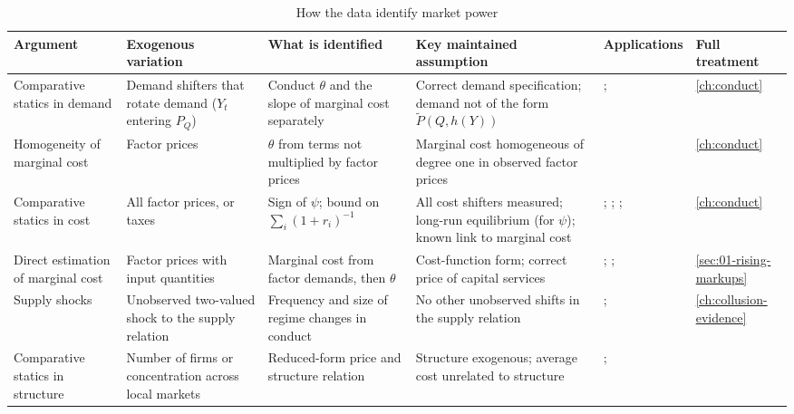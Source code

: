 \begin{table}[htbp]
\centering
\begin{threeparttable}
\caption{How the data identify market power}
\label{tab:01-id-strategies}
\footnotesize
\setlength{\tabcolsep}{4pt}
\begin{tabularx}{\textwidth}{@{}>{\raggedright\arraybackslash}p{2.05cm}
  >{\raggedright\arraybackslash}X >{\raggedright\arraybackslash}X >{\raggedright\arraybackslash}X
  >{\raggedright\arraybackslash}p{2.2cm} >{\raggedright\arraybackslash}p{1.8cm}@{}}
\toprule
Argument & Exogenous variation & What is identified & Key maintained assumption & Applications & Full treatment \\
\midrule
Comparative statics in demand & Demand shifters that rotate demand ($Y_t$ entering $P_Q$) & Conduct $\theta$ and
  the slope of marginal cost separately & Correct demand specification; demand not of the form $\tilde P(Q, h(Y))$ &
  \citet{JustChern1980}; \citet{Bresnahan1981,Bresnahan1987} & \cref{ch:conduct} \\
\addlinespace
Homogeneity of marginal cost & Factor prices & $\theta$ from terms not multiplied by factor prices & Marginal cost
  homogeneous of degree one in observed factor prices & \citet{Appelbaum1979,Appelbaum1982} & \cref{ch:conduct} \\
\addlinespace
Comparative statics in cost & All factor prices, or taxes & Sign of $\psi$; bound on $\sum_i (1 + r_i)^{-1}$ &
  All cost shifters measured; long-run equilibrium (for $\psi$); known link to marginal cost &
  \citet{PanzarRosse1977}; \citet{Shaffer1982}; \citet{Sullivan1985}; \citet{AshenfelterSullivan1987} &
  \cref{ch:conduct} \\
\addlinespace
Direct estimation of marginal cost & Factor prices with input quantities & Marginal cost from factor demands, then
  $\theta$ & Cost-function form; correct price of capital services & \citet{GollopRoberts1979};
  \citet{Appelbaum1982}; \citet{Hall1988} & \cref{sec:01-rising-markups} \\
\addlinespace
Supply shocks & Unobserved two-valued shock to the supply relation & Frequency and size of regime changes in conduct &
  No other unobserved shifts in the supply relation & \citet{Porter1983}; \citet{LeePorter1984} &
  \cref{ch:collusion-evidence} \\
\addlinespace
Comparative statics in structure & Number of firms or concentration across local markets & Reduced-form price and
  structure relation & Structure exogenous; average cost unrelated to structure & \citet{GrahamKaplanSibley1983};

\end{tabularx}
\end{threeparttable}
\end{table}
